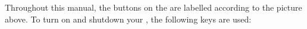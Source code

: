 \begin{center}
  \end{center}

Throughout this manual, the buttons on the \dap are labelled according to the picture above.
To turn on and shutdown your \dap, the following keys are used:

